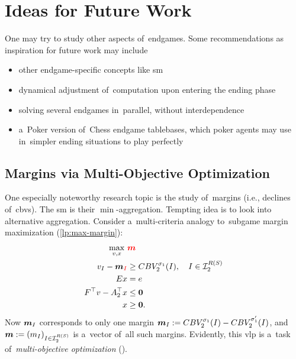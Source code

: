 \chapter{Ideas for Future Work}
\label{ch:future-work}
One may try to study other aspects of~endgames.
Some recommendations as inspiration for future work may include
\begin{itemize}
  \item other endgame-specific concepts like \acrlong{sm}
  \item dynamical adjustment of~computation upon entering the ending phase
  \item solving several endgames in~parallel, without interdependence
  \item a~Poker version of~Chess endgame tablebases, which poker agents may use in~simpler ending situations to play perfectly
\end{itemize}

\section{Margins via Multi-Objective Optimization}
One especially noteworthy research topic is the study of~margins (i.e., declines of~\acrshort{cbv}s).
The \acrlong{sm} is their $\min$-aggregation.
Tempting idea is to look into alternative aggregation.
Consider a~multi-criteria analogy to~subgame margin maximization (\ref{lp:max-margin}):
\begin{equation}
  \label{vlp:max-margins}
  \begin{split}
    \max_{v, x}\ &\textcolor{red}{\boldsymbol{m}} \\
    v_I - \boldsymbol{m}_{\textcolor{red}{I}} &\ge CBV_2^{\sigma_1}(I), \quad I \in \mathcal{I}_2^{R(S)}\\ 
    Ex &= e \\
    F^\top v - A_2^\top x &\le \boldsymbol{0} \\
    x &\ge \boldsymbol{0}.
  \end{split}
\end{equation}
Now $\boldsymbol{m}_I$ corresponds to only one margin $\boldsymbol{m}_I := CBV_2^{\sigma_1} (I) - CBV_2^{\sigma_1'} (I)$, and $\boldsymbol{m} := (m_I) _{I\in\mathcal{I}_2^{R(S)}}$ is a~vector of~all such margins.
Evidently, this \acrfull{vlp} is a~task of~\emph{multi-objective optimization} (\cite{Ehrgott2006multicriteria, Grygarova1996zaklady}).

